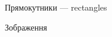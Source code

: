 \begin{problemAllDefault}{Прямокутники --- rectangles}
\Examples
\ifAfour\hspace{-1em}\else\par\fi
\noindent\begin{exampleSimple}{6em}{4em}%
%
%
\end{exampleSimple}
\ifAfour\hspace{-2em}\fi
\begin{exampleSimpleThree}{6em}{4em}{7em}{Зображення}%
%
\end{exampleSimpleThree}
\ifAfour\hspace*{-1em}\fi


\end{problemAllDefault}

\vspace{0.5\baselineskip plus 0.5ex}